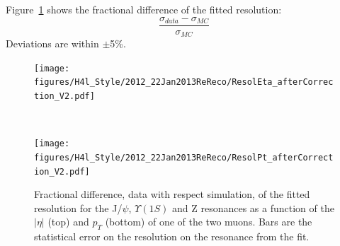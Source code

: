 Figure~\ref{fig:ResolDATAMC_8TeV} shows the fractional difference of the fitted resolution: 
\[
\frac{\sigma_{data}-\sigma_{MC}}{\sigma_{MC}}
\]
Deviations are within $\pm$5\%.
\begin{figure}[hbtp]  
\begin{center}
\texttt{[image: figures/H4l\_Style/2012\_22Jan2013ReReco/ResolEta\_afterCorrection\_V2.pdf]}
\end{center}\\
\begin{center}
\texttt{[image: figures/H4l\_Style/2012\_22Jan2013ReReco/ResolPt\_afterCorrection\_V2.pdf]} 
\end{center}
 \hspace{1cm} 
   \caption{Fractional difference, data with respect simulation, of the fitted resolution for the J/$\psi$,
     $\Upsilon(1S)$ and Z resonances as a function of the $|\eta|$ (top)
     and $p_T$ (bottom) of one of the two muons. Bars are the
     statistical error on the resolution on the resonance from the fit.
   \label{fig:ResolDATAMC_8TeV}}
\end{figure} 



